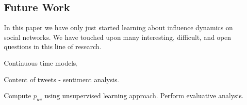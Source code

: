 \documentclass[sigconf]{acmart}
\begin{document}
\subsection{Future Work}

In this paper we have only just started learning about influence dynamics on social networks. We have touched upon many interesting, difficult, and open questions in this line of research. 

Continuous time models, 

Content of tweets - sentiment analysis. 

Compute $p_{uv}$ using unsupervised learning approach. Perform evaluative analysis. 

\nocite{*}


\end{document}
